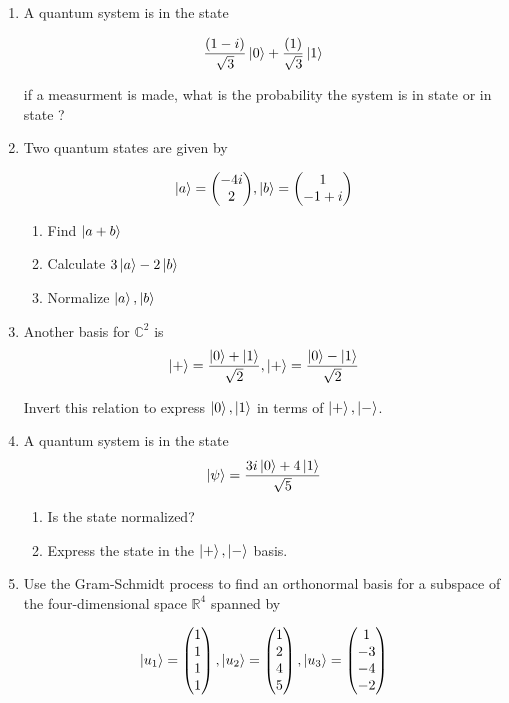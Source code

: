 \documentclass{article}
\begin{document}
\begin{enumerate}
\item A quantum system is in the state

\[\frac{(1-i)}{\sqrt{3}}\ket{0}+ \frac{(1)}{\sqrt{3}}\ket{1}\]

if a measurment is made, what is the probability the system is in state or in state  ?


\item Two quantum states are given by

\[\ket{a}= \mqty( -4i \\ 2 ) , \ket{b}= \mqty( 1 \\ -1+i )\] 

\begin{enumerate}
   \item Find $\ket{a+b}$
   \item Calculate $3\ket{a}-2\ket{b}$
   \item Normalize $\ket{a},\ket{b}$
\end{enumerate}   



\item Another basis for $\mathbb{C}^{2}$  is
\[  \ket{+}=\frac{\ket{0}+\ket{1}}{\sqrt{2}}, \ket{+}=\frac{\ket{0}-\ket{1}}{\sqrt{2}}  \]

Invert this relation to express ${\ket{0} , \ket{1} }$ in terms of ${\ket{+} , \ket{-} }$.

\item A quantum system is in the state
\[ \ket{\psi}=\frac{3i\ket{0}+4\ket{1}}{\sqrt{5}} \] 

\begin{enumerate}
\item Is the state normalized?
\item Express the state in the $\ket{+}, \ket{-}$ basis.
\end{enumerate}




\item Use the Gram-Schmidt process to find an orthonormal basis for a subspace of
the four-dimensional space $\mathbb{R}^{4}$ spanned by

\[ \ket{u_{1}}=
\begin{pmatrix}
1\\
1\\
1\\
1\\
\end{pmatrix},  
\ket{u_{2}}=
\begin{pmatrix}
1\\
2\\
4\\
5\\
\end{pmatrix},
\ket{u_{3}}=
\begin{pmatrix}
1\\
-3\\
-4\\
-2\\
\end{pmatrix}
 \]


\end{enumerate}
\end{document}
